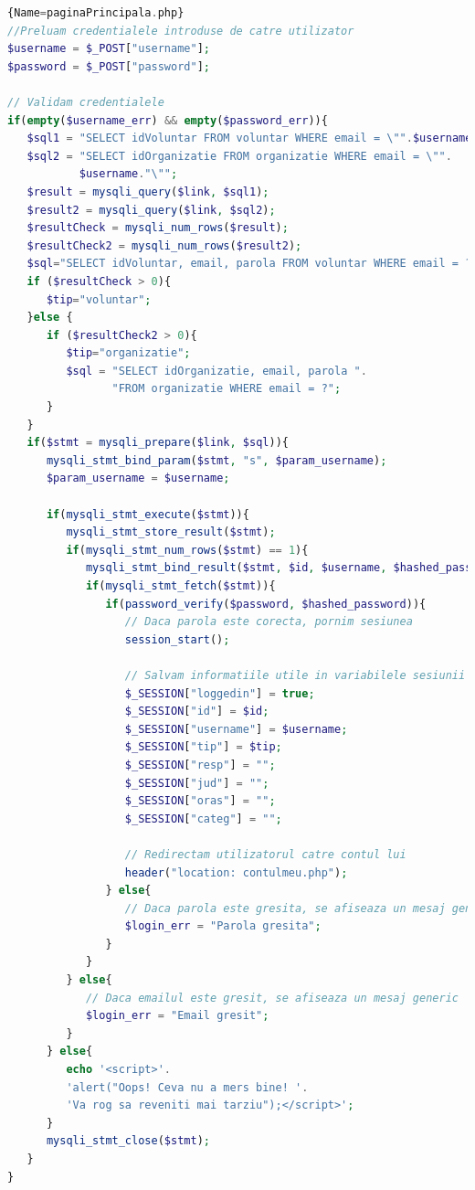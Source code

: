 \documentclass[12pt,a4paper]{report}
\begin{document}
\begin{lstlisting}[basicstyle=\small, language=PHP]{Name=paginaPrincipala.php}
//Preluam credentialele introduse de catre utilizator
$username = $_POST["username"];
$password = $_POST["password"];

// Validam credentialele
if(empty($username_err) && empty($password_err)){
   $sql1 = "SELECT idVoluntar FROM voluntar WHERE email = \"".$username."\"";
   $sql2 = "SELECT idOrganizatie FROM organizatie WHERE email = \"".
           $username."\"";
   $result = mysqli_query($link, $sql1);
   $result2 = mysqli_query($link, $sql2);
   $resultCheck = mysqli_num_rows($result);
   $resultCheck2 = mysqli_num_rows($result2);
   $sql="SELECT idVoluntar, email, parola FROM voluntar WHERE email = ?";
   if ($resultCheck > 0){
      $tip="voluntar";
   }else {
      if ($resultCheck2 > 0){
         $tip="organizatie";
         $sql = "SELECT idOrganizatie, email, parola ".
                "FROM organizatie WHERE email = ?";
      }
   }
   if($stmt = mysqli_prepare($link, $sql)){
      mysqli_stmt_bind_param($stmt, "s", $param_username);
      $param_username = $username;

      if(mysqli_stmt_execute($stmt)){
         mysqli_stmt_store_result($stmt);
         if(mysqli_stmt_num_rows($stmt) == 1){
            mysqli_stmt_bind_result($stmt, $id, $username, $hashed_password);
            if(mysqli_stmt_fetch($stmt)){
               if(password_verify($password, $hashed_password)){
                  // Daca parola este corecta, pornim sesiunea
                  session_start();

                  // Salvam informatiile utile in variabilele sesiunii
                  $_SESSION["loggedin"] = true;
                  $_SESSION["id"] = $id;
                  $_SESSION["username"] = $username;
                  $_SESSION["tip"] = $tip;
                  $_SESSION["resp"] = "";
                  $_SESSION["jud"] = "";
                  $_SESSION["oras"] = "";
                  $_SESSION["categ"] = "";

                  // Redirectam utilizatorul catre contul lui
                  header("location: contulmeu.php");
               } else{
                  // Daca parola este gresita, se afiseaza un mesaj generic
                  $login_err = "Parola gresita";
               }
            }
         } else{
            // Daca emailul este gresit, se afiseaza un mesaj generic
            $login_err = "Email gresit";
         }
      } else{
         echo '<script>'.
         'alert("Oops! Ceva nu a mers bine! '.
         'Va rog sa reveniti mai tarziu");</script>';
      }
      mysqli_stmt_close($stmt);
   }
}
\end{lstlisting}
\end{document}
